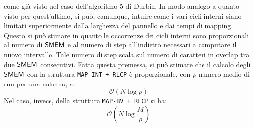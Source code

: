 come già visto nel caso dell'algoritmo 5 di Durbin. In modo analogo a quanto
visto per quest'ultimo, si può,
comunque, intuire come i vari cicli interni siano limitati superiormente dalla
larghezza del pannello e dai tempi di mapping. Questo si può stimare in quanto
le occorrenze dei cicli interni sono proporzionali al numero di $\mbox{\rm {\sf SMEM}}$ e al
numero 
di step all'indietro necessari a computare il nuovo intervallo. Tale numero di
step scala sul numero di caratteri in overlap tra due $\mbox{\rm {\sf SMEM}}$
consecutivi. Fatta questa premessa, si può stimare che il calcolo degli $\mbox{\rm {\sf SMEM}}$
con
la struttura \texttt{MAP-INT + RLCP} è proporzionale, con $\rho$ numero medio di
run per una colonna, a:
\begin{equation}
  \label{eq:lcpmatchint}
  \mathcal{O}(N\log \rho)
\end{equation}
Nel caso, invece, della struttura \texttt{MAP-BV + RLCP} si ha:
\begin{equation}
  \label{eq:lcpmatchbv}
  \mathcal{O}\left(N\log\frac{M}{\rho}\right)
\end{equation}

